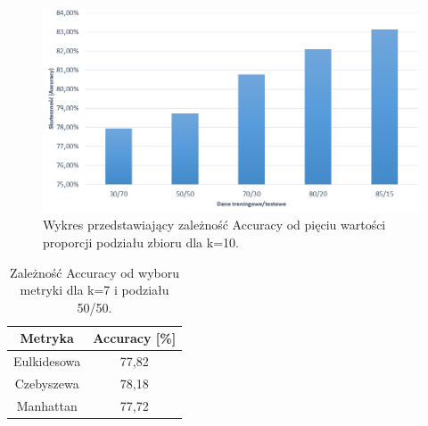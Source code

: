 \documentclass{classrep}
\begin{document}
\begin{figure}[h!]
    \centering
    \includegraphics[width=1.1\textwidth]{5podzialk10.png}
    \caption{Wykres przedstawiający zależność Accuracy od pięciu wartości proporcji podziału zbioru dla k=10.}
    \label{5podzialk10}
\end{figure}

\begin{table}[h!]
	\centering
	\begin{tabular} {c c}
		\hline
		\textbf{Metryka} & \textbf{Accuracy [\%]} \\ [0.5ex] 
		\hline
		\hline 
		Eulkidesowa & 77,82 \\ 
		Czebyszewa & 78,18 \\
		Manhattan &77,72 \\
		\hline
	\end{tabular}
	\caption{Zależność Accuracy od wyboru metryki dla k=7 i podziału 50/50. }
\end{table}
\end{document}
